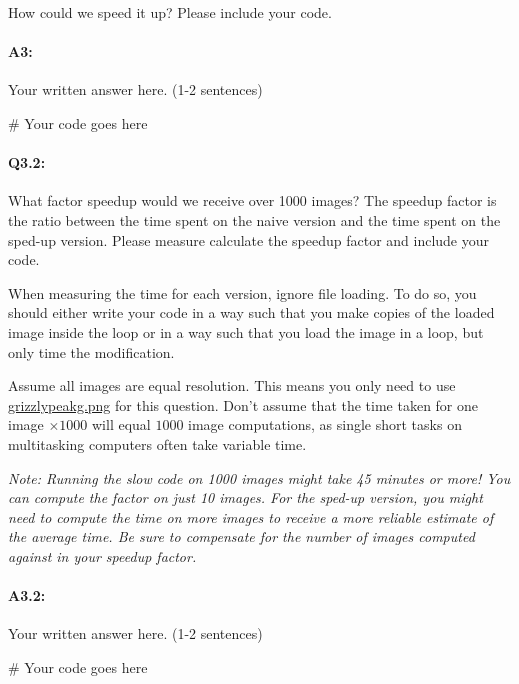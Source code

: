 \documentclass[11pt]{article}
\begin{document}
How could we speed it up? Please include your code. \\

\paragraph{A3:} Your written answer here. (1-2 sentences)
\begin{python}
# Your code goes here
\end{python}



\pagebreak
\paragraph{Q3.2:} What factor speedup would we receive over 1000 images? The speedup factor is the ratio between the time spent on the naive version and the time spent on the sped-up version. Please measure calculate the speedup factor and include your code.

When measuring the time for each version, ignore file loading. To do so, you should either write your code in a way such that you make copies of the loaded image inside the loop or in a way such that you load the image in a loop, but only time the modification.

Assume all images are equal resolution. This means you only need to use \href{grizzlypeakg.png}{grizzlypeakg.png} for this question. Don't assume that the time taken for one image $\times1000$ will equal $1000$ image computations, as single short tasks on multitasking computers often take variable time.



\emph{Note: Running the slow code on 1000 images might take 45 minutes or more! You can compute the factor on just 10 images. For the sped-up version, you might need to compute the time on more images to receive a more reliable estimate of the average time. Be sure to compensate for the number of images computed against in your speedup factor.}

\paragraph{A3.2:} Your written answer here. (1-2 sentences)
\begin{python}
# Your code goes here
\end{python}
\end{document}
